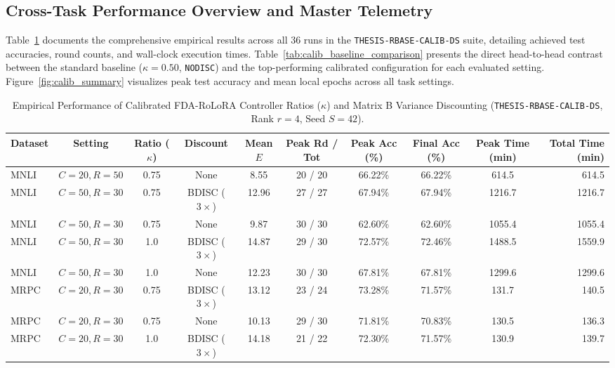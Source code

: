 \documentclass[10pt,a4paper]{article}
\begin{document}
\subsection{Cross-Task Performance Overview and Master Telemetry}

Table~\ref{tab:calib_master} documents the comprehensive empirical results across all 36 runs in the \texttt{THESIS-RBASE-CALIB-DS} suite, detailing achieved test accuracies, round counts, and wall-clock execution times.
Table~\ref{tab:calib_baseline_comparison} presents the direct head-to-head contrast between the standard baseline ($\kappa=0.50$, \texttt{NODISC}) and the top-performing calibrated configuration for each evaluated setting.
Figure~\ref{fig:calib_summary} visualizes peak test accuracy and mean local epochs across all task settings.

\begin{table}[H]
\centering
\caption{Empirical Performance of Calibrated FDA-RoLoRA Controller Ratios ($\kappa$) and Matrix B Variance Discounting (\texttt{THESIS-RBASE-CALIB-DS}, Rank $r=4$, Seed $S=42$).}
\label{tab:calib_master}
\scriptsize
\setlength{\tabcolsep}{1.8pt}
\begin{tabular*}{\textwidth}{@{\extracolsep{\fill}}lccccccccr@{}}
\toprule
\textbf{Dataset} & \textbf{Setting} & \textbf{Ratio ($\kappa$)} & \textbf{Discount} & \textbf{Mean $E$} & \textbf{Peak Rd / Tot} & \textbf{Peak Acc (\%)} & \textbf{Final Acc (\%)} & \textbf{Peak Time (min)} & \textbf{Total Time (min)} \\
\midrule
MNLI & $C=20, R=50$ & 0.75 & None & 8.55 & 20 / 20 & 66.22\% & 66.22\% & 614.5 & 614.5 \\
\midrule
MNLI & $C=50, R=30$ & 0.75 & BDISC ($3\times$) & 12.96 & 27 / 27 & 67.94\% & 67.94\% & 1216.7 & 1216.7 \\
MNLI & $C=50, R=30$ & 0.75 & None & 9.87 & 30 / 30 & 62.60\% & 62.60\% & 1055.4 & 1055.4 \\
MNLI & $C=50, R=30$ & 1.0 & BDISC ($3\times$) & 14.87 & 29 / 30 & 72.57\% & 72.46\% & 1488.5 & 1559.9 \\
MNLI & $C=50, R=30$ & 1.0 & None & 12.23 & 30 / 30 & 67.81\% & 67.81\% & 1299.6 & 1299.6 \\
\midrule
MRPC & $C=20, R=30$ & 0.75 & BDISC ($3\times$) & 13.12 & 23 / 24 & 73.28\% & 71.57\% & 131.7 & 140.5 \\
MRPC & $C=20, R=30$ & 0.75 & None & 10.13 & 29 / 30 & 71.81\% & 70.83\% & 130.5 & 136.3 \\
MRPC & $C=20, R=30$ & 1.0 & BDISC ($3\times$) & 14.18 & 21 / 22 & 72.30\% & 71.57\% & 130.9 & 139.7 \\

\end{tabular*}
\end{table}
\end{document}
